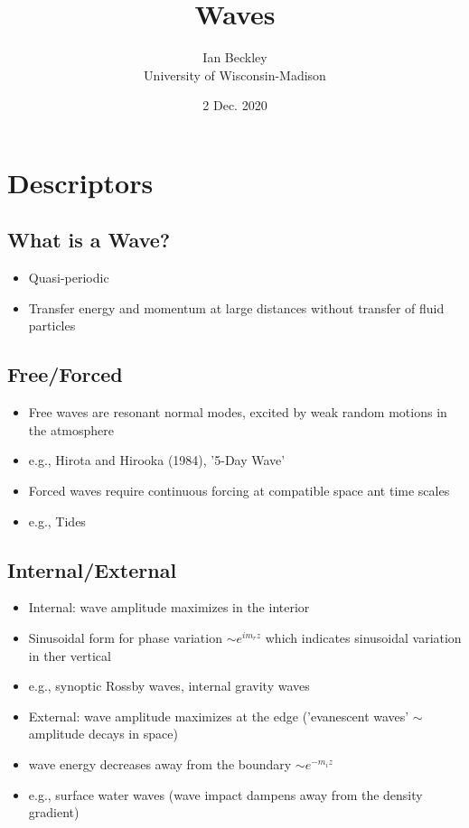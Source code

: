 \documentclass[a4paper,12pt]{article}
\begin{document}
\title{\vspace{-4.0cm}Waves}
\author{Ian Beckley
\\University of Wisconsin-Madison}

\date{2 Dec. 2020}

\maketitle

\section*{Descriptors}
\subsection*{What is a Wave?}
\begin{itemize}
	\item Quasi-periodic
	\item Transfer energy and momentum at large distances without transfer of fluid particles
\end{itemize}

\subsection*{Free/Forced}
\begin{itemize}
	\item Free waves are resonant normal modes, excited by weak random motions in the atmosphere
	\item e.g., Hirota and Hirooka (1984), '5-Day Wave'
	\item Forced waves require continuous forcing at compatible space ant time scales
	\item e.g., Tides
\end{itemize}

\subsection*{Internal/External}
\begin{itemize}
	\item Internal: wave amplitude maximizes in the interior
	\item Sinusoidal form for phase variation $\sim e^{i m_r z}$ which indicates sinusoidal variation in ther vertical
	\item e.g., synoptic Rossby waves, internal gravity waves\\
	\item External: wave amplitude maximizes at the edge ('evanescent waves' $\sim$ amplitude decays in space)
	\item wave energy decreases away from the boundary $\sim e^{-m_i z}$
	\item e.g.,  surface water waves (wave impact dampens away from the density gradient)
\end{itemize}
\end{document}
